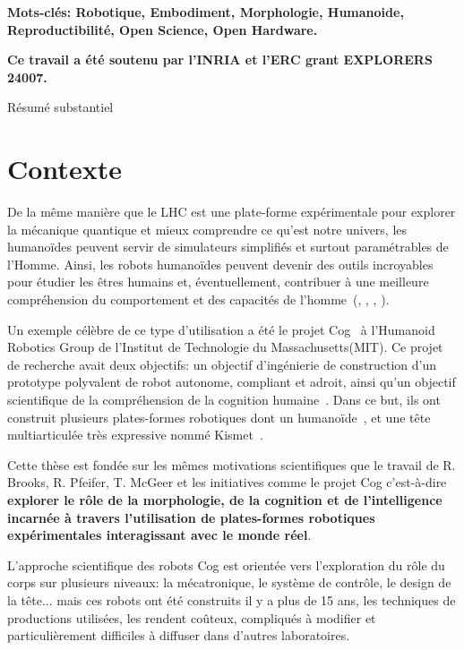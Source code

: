 \textbf{Mots-clés: Robotique, Embodiment, Morphologie, Humanoide, Reproductibilité, Open Science, Open Hardware.} 

\textbf{Ce travail a été soutenu par l'INRIA et l'ERC grant EXPLORERS 24007.}



\cleartoleftpage 
\cleardoublepage

{Résumé substantiel}

\section*{Contexte} %

De la même manière que le LHC est une plate-forme expérimentale pour explorer la mécanique quantique et mieux comprendre ce qu’est notre univers, les humanoïdes peuvent servir de simulateurs simplifiés et surtout paramétrables de l'Homme. Ainsi, les robots humanoïdes peuvent devenir des outils incroyables pour étudier les êtres humains et, éventuellement, contribuer à une meilleure compréhension du comportement et des capacités de l’homme~(\cite{atkeson2000using}, \cite{cheng2007cb}, \cite{brooks1986achieving}, \cite{oudeyer2010impact}).

Un exemple célèbre de ce type  d’utilisation a été le projet Cog~\parencite{brooks1999cog} à l'Humanoid Robotics Group de l'Institut de Technologie du Massachusetts(MIT). Ce projet de recherche avait deux objectifs: un objectif d'ingénierie de construction d'un prototype polyvalent de robot autonome, compliant et adroit, ainsi qu’un objectif scientifique de la compréhension de la cognition humaine~\parencite{brooks1994building}. Dans ce but, ils ont construit plusieurs plates-formes robotiques dont un humanoïde~\parencite{brooks1999cog}, et une tête multiarticulée très expressive nommé Kismet~\parencite{breazeal2003emotion}.

Cette thèse est fondée sur les mêmes motivations scientifiques que le travail de R. Brooks, R. Pfeifer, T. McGeer et les initiatives comme le projet Cog c’est-à-dire \textbf{explorer le rôle de la morphologie, de la cognition et de l'intelligence incarnée à travers l'utilisation de plates-formes robotiques expérimentales interagissant avec le monde réel}.

L'approche scientifique des robots Cog est orientée vers l'exploration du rôle du corps sur plusieurs niveaux: la mécatronique, le système de contrôle, le design de la tête...  mais ces robots ont été construits il y a plus de 15 ans, les techniques de productions utilisées, les rendent coûteux, compliqués à modifier et particulièrement difficiles à diffuser dans d'autres laboratoires.

